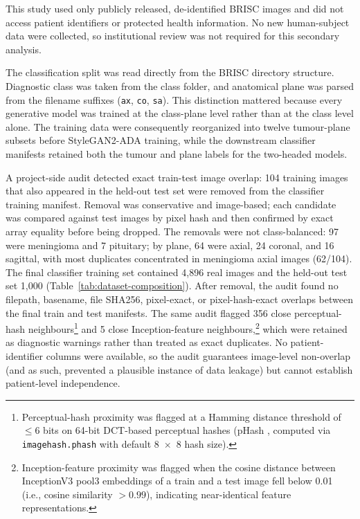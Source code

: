 \documentclass[conference,twoside]{IEEEtran}
\begin{document}
This study used only publicly released, de-identified BRISC images and did not access patient identifiers or protected health information. No new human-subject data were collected, so institutional review was not required for this secondary analysis.

The classification split was read directly from the BRISC directory structure. Diagnostic class was taken from the class folder, and anatomical plane was parsed from the filename suffixes (\texttt{ax}, \texttt{co}, \texttt{sa}). This distinction mattered because every generative model was trained at the class-plane level rather than at the class level alone. The training data were consequently reorganized into twelve tumour-plane subsets before StyleGAN2-ADA training, while the downstream classifier manifests retained both the tumour and plane labels for the two-headed models.

A project-side audit detected exact train-test image overlap: 104 training images that also appeared in the held-out test set were removed from the classifier training manifest. Removal was conservative and image-based; each candidate was compared against test images by pixel hash and then confirmed by exact array equality before being dropped. The removals were not class-balanced: 97 were meningioma and 7 pituitary; by plane, 64 were axial, 24 coronal, and 16 sagittal, with most duplicates concentrated in meningioma axial images (62/104). The final classifier training set contained 4,896 real images and the held-out test set 1,000 (Table~\ref{tab:dataset-composition}). After removal, the audit found no filepath, basename, file SHA256, pixel-exact, or pixel-hash-exact overlaps between the final train and test manifests. The same audit flagged 356 close perceptual-hash neighbours\footnote{Perceptual-hash proximity was flagged at a Hamming distance threshold of $\leq 6$ bits on 64-bit DCT-based perceptual hashes (pHash \cite{zauner2010phash}, computed via \texttt{imagehash.phash} with default 8~$\times$~8 hash size).} and 5 close Inception-feature neighbours,\footnote{Inception-feature proximity was flagged when the cosine distance between InceptionV3 pool3 embeddings of a train and a test image fell below 0.01 (i.e., cosine similarity $> 0.99$), indicating near-identical feature representations.} which were retained as diagnostic warnings rather than treated as exact duplicates. No patient-identifier columns were available, so the audit guarantees image-level non-overlap (and as such, prevented a plausible instance of data leakage) but cannot establish patient-level independence.
\end{document}
